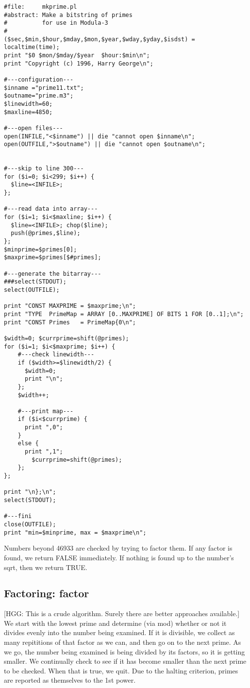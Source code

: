 \begin{tt} \begin{verbatim}
#file:     mkprime.pl
#abstract: Make a bitstring of primes
#          for use in Modula-3
#
($sec,$min,$hour,$mday,$mon,$year,$wday,$yday,$isdst) = localtime(time);
print "$0 $mon/$mday/$year  $hour:$min\n";
print "Copyright (c) 1996, Harry George\n";

#---configuration---
$inname ="prime11.txt";
$outname="prime.m3";
$linewidth=60;
$maxline=4850;

#---open files---
open(INFILE,"<$inname") || die "cannot open $inname\n";
open(OUTFILE,">$outname") || die "cannot open $outname\n";


#---skip to line 300---
for ($i=0; $i<299; $i++) {
  $line=<INFILE>;
};

#---read data into array---
for ($i=1; $i<$maxline; $i++) {
  $line=<INFILE>; chop($line);
  push(@primes,$line);
};    
$minprime=$primes[0];
$maxprime=$primes[$#primes];

#---generate the bitarray---
###select(STDOUT);
select(OUTFILE);

print "CONST MAXPRIME = $maxprime;\n";
print "TYPE  PrimeMap = ARRAY [0..MAXPRIME] OF BITS 1 FOR [0..1];\n";
print "CONST Primes   = PrimeMap{0\n";

$width=0; $currprime=shift(@primes);
for ($i=1; $i<$maxprime; $i++) {
    #---check linewidth---
    if ($width>=$linewidth/2) {
      $width=0;
      print "\n";
    };
    $width++;

    #---print map---
    if ($i<$currprime) {
      print ",0";
    }
    else {
      print ",1";
    	$currprime=shift(@primes);
    };
}; 

print "\n};\n";
select(STDOUT);

#---fini
close(OUTFILE);
print "min=$minprime, max = $maxprime\n";
\end{verbatim} \end{tt}

Numbers beyond 46933 are checked by trying to factor them.
If any factor is found, we return FALSE immediately.  If nothing is
found up to the number's sqrt, then we return TRUE.

\subsection*{Factoring: factor}
[HGG: This is a crude algorithm.  Surely there are better approaches
available.]  We start with the lowest prime and determine (via mod)
whether or not it divides evenly into the number being examined.
If it is divisible, we collect as many repititions of that factor
as we can, and then go on to the next prime.  As we go, the number being
examined is being divided by its factors, so it is getting smaller.
We continually check to see if it has become smaller than the next prime to
be checked.  When that is true, we quit.
Due to the halting criterion, primes are reported as themselves
to the 1st power.

